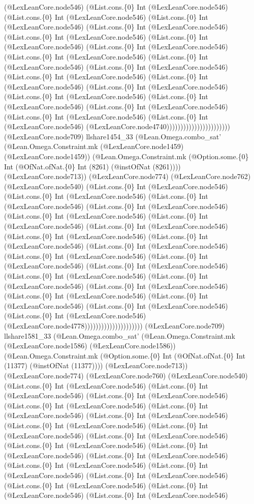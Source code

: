 \documentclass[11pt]{article}
\begin{document}
(@LexLeanCore.node546) (@List.cons.\{0\} Int (@LexLeanCore.node546) (@List.cons.\{0\} Int (@LexLeanCore.node546) (@List.cons.\{0\} Int (@LexLeanCore.node546) (@List.cons.\{0\} Int (@LexLeanCore.node546) (@List.cons.\{0\} Int (@LexLeanCore.node546) (@List.cons.\{0\} Int (@LexLeanCore.node546) (@List.cons.\{0\} Int (@LexLeanCore.node546) (@List.cons.\{0\} Int (@LexLeanCore.node546) (@List.cons.\{0\} Int (@LexLeanCore.node546) (@List.cons.\{0\} Int (@LexLeanCore.node546) (@List.cons.\{0\} Int (@LexLeanCore.node546) (@List.cons.\{0\} Int (@LexLeanCore.node546) (@List.cons.\{0\} Int (@LexLeanCore.node546) (@List.cons.\{0\} Int (@LexLeanCore.node546) (@List.cons.\{0\} Int (@LexLeanCore.node546) (@List.cons.\{0\} Int (@LexLeanCore.node546) (@List.cons.\{0\} Int (@LexLeanCore.node546) (@List.cons.\{0\} Int (@LexLeanCore.node546) (@LexLeanCore.node4740))))))))))))))))))))))) (@LexLeanCore.node709) llshare1454\_33 (@Lean.Omega.combo\_sat' (@Lean.Omega.Constraint.mk (@LexLeanCore.node1459) (@LexLeanCore.node1459)) (@Lean.Omega.Constraint.mk (@Option.some.\{0\} Int (@OfNat.ofNat.\{0\} Int (8261) (@instOfNat (8261)))) (@LexLeanCore.node713)) (@LexLeanCore.node774) (@LexLeanCore.node762) (@LexLeanCore.node540) (@List.cons.\{0\} Int (@LexLeanCore.node546) (@List.cons.\{0\} Int (@LexLeanCore.node546) (@List.cons.\{0\} Int (@LexLeanCore.node546) (@List.cons.\{0\} Int (@LexLeanCore.node546) (@List.cons.\{0\} Int (@LexLeanCore.node546) (@List.cons.\{0\} Int (@LexLeanCore.node546) (@List.cons.\{0\} Int (@LexLeanCore.node546) (@List.cons.\{0\} Int (@LexLeanCore.node546) (@List.cons.\{0\} Int (@LexLeanCore.node546) (@List.cons.\{0\} Int (@LexLeanCore.node546) (@List.cons.\{0\} Int (@LexLeanCore.node546) (@List.cons.\{0\} Int (@LexLeanCore.node546) (@List.cons.\{0\} Int (@LexLeanCore.node546) (@List.cons.\{0\} Int (@LexLeanCore.node546) (@List.cons.\{0\} Int (@LexLeanCore.node546) (@List.cons.\{0\} Int (@LexLeanCore.node546) (@List.cons.\{0\} Int (@LexLeanCore.node546) (@List.cons.\{0\} Int (@LexLeanCore.node546) (@List.cons.\{0\} Int (@LexLeanCore.node546) (@List.cons.\{0\} Int (@LexLeanCore.node546) (@LexLeanCore.node4778))))))))))))))))))))) (@LexLeanCore.node709) llshare1581\_33 (@Lean.Omega.combo\_sat' (@Lean.Omega.Constraint.mk (@LexLeanCore.node1586) (@LexLeanCore.node1586)) (@Lean.Omega.Constraint.mk (@Option.some.\{0\} Int (@OfNat.ofNat.\{0\} Int (11377) (@instOfNat (11377)))) (@LexLeanCore.node713)) (@LexLeanCore.node774) (@LexLeanCore.node760) (@LexLeanCore.node540) (@List.cons.\{0\} Int (@LexLeanCore.node546) (@List.cons.\{0\} Int (@LexLeanCore.node546) (@List.cons.\{0\} Int (@LexLeanCore.node546) (@List.cons.\{0\} Int (@LexLeanCore.node546) (@List.cons.\{0\} Int (@LexLeanCore.node546) (@List.cons.\{0\} Int (@LexLeanCore.node546) (@List.cons.\{0\} Int (@LexLeanCore.node546) (@List.cons.\{0\} Int (@LexLeanCore.node546) (@List.cons.\{0\} Int (@LexLeanCore.node546) (@List.cons.\{0\} Int (@LexLeanCore.node546) (@List.cons.\{0\} Int (@LexLeanCore.node546) (@List.cons.\{0\} Int (@LexLeanCore.node546) (@List.cons.\{0\} Int (@LexLeanCore.node546) (@List.cons.\{0\} Int (@LexLeanCore.node546) (@List.cons.\{0\} Int (@LexLeanCore.node546) (@List.cons.\{0\} Int (@LexLeanCore.node546) (@List.cons.\{0\} Int (@LexLeanCore.node546) (@List.cons.\{0\} Int (@LexLeanCore.node546) 
\end{document}
